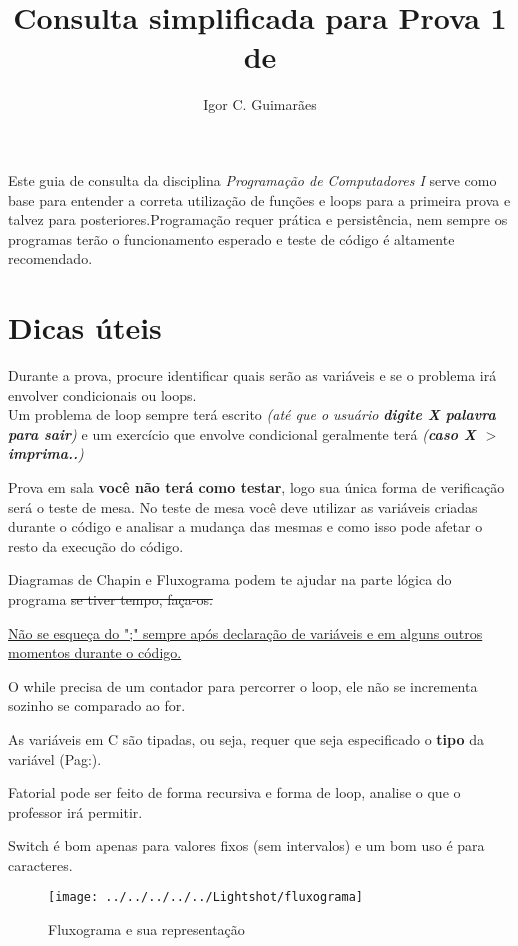 \documentclass[12pt]{article}
\title{Consulta simplificada para Prova 1 de \disciplina}
\author{Igor C. Guimarães \inst{1}}
\newcommand{\disciplina}{\textit{Programação de Computadores I }}
\begin{document}
 

\maketitle

     
\begin{resumo} 
  Este guia de consulta da disciplina \disciplina serve como base para entender a correta utilização de funções e loops para a primeira prova e talvez para posteriores.Programação requer prática e persistência, nem sempre os programas terão o funcionamento esperado e teste de código é altamente recomendado. 
\end{resumo}
\newpage
\tableofcontents
\newpage
\section{Dicas úteis}
Durante a prova, procure identificar quais serão as variáveis e se o problema irá envolver condicionais ou loops. \\Um problema de loop sempre terá escrito \textit{(até que o usuário \textbf{digite X palavra para sair})} e um exercício que envolve condicional geralmente terá \textit{(\textbf{caso X $>$ imprima..})}

\begin{flushleft}
	Prova em sala \textbf{você não terá como testar}, logo sua única forma de verificação será o teste de mesa. No teste de mesa você deve utilizar as variáveis criadas durante o código e analisar a mudança das mesmas e como isso pode afetar o resto da execução do código.
	
	Diagramas de Chapin e Fluxograma podem te ajudar na parte lógica do programa \sout{se tiver tempo, faça-os.}
	
	\uline{Não se esqueça do ";" sempre após declaração de variáveis e em alguns outros momentos durante o código.}
	
	O while precisa de um contador para percorrer o loop, ele não se incrementa sozinho se comparado ao for.
	
	As variáveis em C são tipadas, ou seja, requer que seja especificado o \textbf{tipo} da variável (Pag:\pageref{tipovariavel}).
	
	Fatorial pode ser feito de forma recursiva e forma de loop, analise o que o professor irá permitir.
	
	Switch é bom apenas para valores fixos (sem intervalos) e um bom uso é para caracteres.
	
\end{flushleft}
\begin{figure}[h]
	\centering
	\texttt{[image: ../../../../../Lightshot/fluxograma]}
	\caption{Fluxograma e sua representação}
	\label{fig:fluxograma}
\end{figure}
\end{document}
